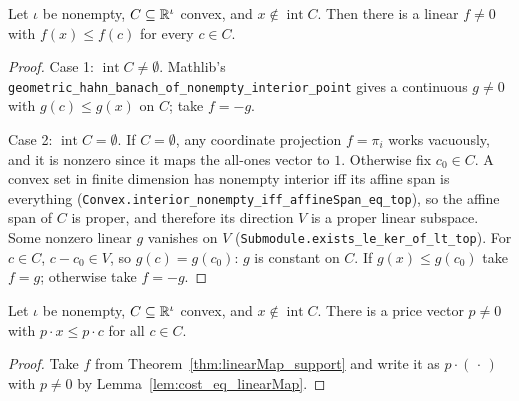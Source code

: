 \begin{theorem}
\label{thm:linearMap_support}
\leanok
Let $\iota$ be nonempty, $C \subseteq \mathbb{R}^\iota$ convex, and $x \notin \operatorname{int} C$. Then there is a linear
$f \neq 0$ with $f(x) \le f(c)$ for every $c \in C$.
\end{theorem}
\begin{proof}
\leanok
Case 1: $\operatorname{int} C \neq \emptyset$. Mathlib's
\texttt{geometric\_hahn\_banach\_of\_nonempty\_interior\_point} gives a continuous $g \neq 0$ with $g(c) \le g(x)$ on
$C$; take $f = -g$.

Case 2: $\operatorname{int} C = \emptyset$. If $C = \emptyset$, any coordinate projection $f = \pi_i$ works vacuously,
and it is nonzero since it maps the all-ones vector to $1$. Otherwise fix $c_0 \in C$. A convex set in finite
dimension has nonempty interior iff its affine span is everything
(\texttt{Convex.interior\_nonempty\_iff\_affineSpan\_eq\_top}), so the affine span of $C$ is proper, and therefore its
direction $V$ is a proper linear subspace. Some nonzero linear $g$ vanishes on $V$
(\texttt{Submodule.exists\_le\_ker\_of\_lt\_top}). For $c \in C$, $c - c_0 \in V$, so $g(c) = g(c_0)$: $g$ is constant
on $C$. If $g(x) \le g(c_0)$ take $f = g$; otherwise take $f = -g$.
\end{proof}

\begin{theorem}
\label{thm:price_support}
\leanok
{}
Let $\iota$ be nonempty, $C \subseteq \mathbb{R}^\iota$ convex, and $x \notin \operatorname{int} C$. There is a price vector
$p \neq 0$ with $p \cdot x \le p \cdot c$ for all $c \in C$.
\end{theorem}
\begin{proof}
\leanok
Take $f$ from Theorem~\ref{thm:linearMap_support} and write it as $p \cdot (\,\cdot\,)$ with $p \neq 0$ by
Lemma~\ref{lem:cost_eq_linearMap}.
\end{proof}
